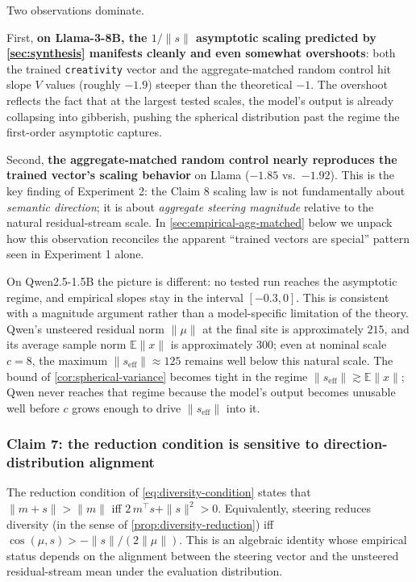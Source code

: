 Two observations dominate.

First, \textbf{on Llama-3-8B, the $1/\|s\|$ asymptotic scaling predicted by \ref{sec:synthesis} manifests cleanly and even somewhat overshoots}: both the trained \texttt{creativity} vector and the aggregate-matched random control hit slope $V$ values (roughly $-1.9$) steeper than the theoretical $-1$. The overshoot reflects the fact that at the largest tested scales, the model's output is already collapsing into gibberish, pushing the spherical distribution past the regime the first-order asymptotic captures.

Second, \textbf{the aggregate-matched random control nearly reproduces the trained vector's scaling behavior} on Llama ($-1.85$ vs.\ $-1.92$). This is the key finding of Experiment 2: the Claim 8 scaling law is not fundamentally about \emph{semantic direction}; it is about \emph{aggregate steering magnitude} relative to the natural residual-stream scale. In \ref{sec:empirical-agg-matched} below we unpack how this observation reconciles the apparent ``trained vectors are special'' pattern seen in Experiment 1 alone.

On Qwen2.5-1.5B the picture is different: no tested run reaches the asymptotic regime, and empirical slopes stay in the interval $[-0.3, 0]$. This is consistent with a magnitude argument rather than a model-specific limitation of the theory. Qwen's unsteered residual norm $\|\mu\|$ at the final site is approximately $215$, and its average sample norm $\mathbb{E}\|x\|$ is approximately $300$; even at nominal scale $c = 8$, the maximum $\|s_\mathrm{eff}\| \approx 125$ remains well below this natural scale. The bound of \ref{cor:spherical-variance} becomes tight in the regime $\|s_\mathrm{eff}\| \gtrsim \mathbb{E}\|x\|$; Qwen never reaches that regime because the model's output becomes unusable well before $c$ grows enough to drive $\|s_\mathrm{eff}\|$ into it.

\subsubsection{Claim 7: the reduction condition is sensitive to direction-distribution alignment}
\label{sec:empirical-claim7}

The reduction condition of \ref{eq:diversity-condition} states that $\|m+s\| > \|m\|$ iff $2\,m^\top s + \|s\|^2 > 0$. Equivalently, steering reduces diversity (in the sense of \ref{prop:diversity-reduction}) iff $\cos(\mu, s) > -\|s\|/(2\|\mu\|)$. This is an algebraic identity whose empirical status depends on the alignment between the steering vector and the unsteered residual-stream mean under the evaluation distribution.

